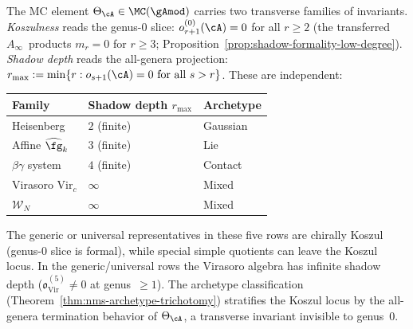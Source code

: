 \begin{remark}
\label{rem:koszulness-vs-shadow-depth}

The MC element $\Theta_\cA \in \MC(\gAmod)$ carries two
transverse families of invariants.
\emph{Koszulness} reads the genus-$0$ slice:
$o_{r+1}^{(0)}(\cA) = 0$ for all $r \geq 2$
(the transferred $A_\infty$~products $m_r = 0$ for $r \geq 3$;
Proposition~\ref{prop:shadow-formality-low-degree}).
\emph{Shadow depth} reads the all-genera projection:
$r_{\max} := \min\{r : o_{s+1}(\cA) = 0 \text{ for all } s > r\}$.
These are independent:
\begin{center}
\begin{tabular}{lll}
\hline
\textbf{Family} & \textbf{Shadow depth $r_{\max}$}
 & \textbf{Archetype} \\
\hline
Heisenberg & $2$ (finite) & Gaussian \\
Affine $\widehat{\fg}_k$ & $3$ (finite) & Lie \\
$\beta\gamma$ system & $4$ (finite) & Contact \\
Virasoro $\mathrm{Vir}_c$ & $\infty$ & Mixed \\
$\mathcal{W}_N$ & $\infty$ & Mixed \\
\hline
\end{tabular}
\end{center}
The generic or universal representatives in these five rows are chirally
Koszul (genus-$0$ slice is formal), while special simple quotients can
leave the Koszul locus. In the generic/universal rows the
Virasoro algebra has infinite shadow depth
($\mathfrak{o}^{(5)}_{\mathrm{Vir}} \neq 0$
at genus~$\geq 1$). The archetype classification
(Theorem~\ref{thm:nms-archetype-trichotomy}) stratifies the
Koszul locus by the all-genera termination behavior of
$\Theta_\cA$, a transverse invariant invisible to genus~$0$.
\end{remark}

